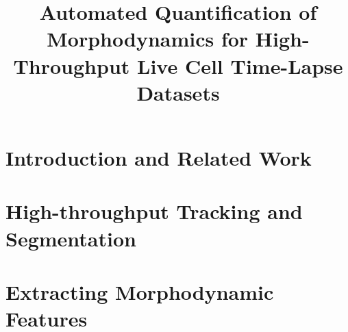 \documentclass{article}
\begin{document}
%
%
%
%
\title{Automated Quantification of Morphodynamics
for High-Throughput Live Cell Time-Lapse Datasets}


%
\address{$^{1}$ Research Laboratory of Electronics, MIT \hspace{5mm} 
         $^{2}$ Institute of Biochemistry, University of Basel \\
         $^{3}$ Computer Vision Lab, EPFL \hspace{5mm} 
         $^{4}$ Light Microscopy and Screening Center, ETHZ}


\newcommand{\comment}[1]{}
\maketitle              %

\begin{abstract}

\end{abstract}

\section{Introduction and Related Work}
\label{sec:intro}


%

\section{High-throughput Tracking and Segmentation}
\label{sec:method}


\section{Extracting Morphodynamic Features}
\label{sec:features}

\end{document}
